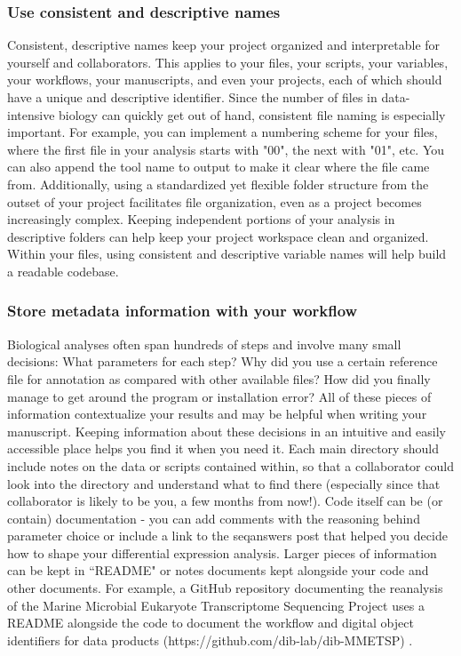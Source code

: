 \documentclass[10pt,letterpaper]{article}
\begin{document}
\subsubsection*{Use consistent and descriptive names}  
Consistent, descriptive names keep your project organized and interpretable for yourself and collaborators. 
This applies to your files, your scripts, your variables, your workflows, your manuscripts, and even your projects, each of which should have a unique and descriptive identifier. 
Since the number of files in data-intensive biology can quickly get out of hand, consistent file naming is especially important. 
For example, you can implement a numbering scheme for your files, where the first file in your analysis starts with "00", the next with "01", etc. 
You can also append the tool name to output to make it clear where the file came from. 
Additionally, using a standardized yet flexible folder structure from the outset of your project facilitates file organization, even as a project becomes increasingly complex. 
Keeping independent portions of your analysis in descriptive folders can help keep your project workspace clean and organized.
Within your files, using consistent and descriptive variable names will help build a readable codebase.

\subsubsection*{Store metadata information with your workflow} 
Biological analyses often span hundreds of steps and involve many small decisions: What parameters for each step? 
Why did you use a certain reference file for annotation as compared with other available files? 
How did you finally manage to get around the program or installation error? 
All of these pieces of information contextualize your results and may be helpful when writing your manuscript. 
Keeping information about these decisions in an intuitive and easily accessible place helps you find it when you need it. 
Each main directory should include notes on the data or scripts contained within, so that a collaborator could look into the directory and understand what to find there (especially since that collaborator is likely to be you, a few months from now!).
Code itself can be (or contain) documentation - you can add comments with the reasoning behind parameter choice or include a link to the seqanswers post that helped you decide how to shape your differential expression analysis. 
Larger pieces of information can be kept in ``README" or notes documents kept alongside your code and other documents. 
For example, a GitHub repository documenting the reanalysis of the Marine Microbial Eukaryote Transcriptome Sequencing Project uses a README alongside the code to document the workflow and digital object identifiers for data products (https://github.com/dib-lab/dib-MMETSP) \cite{johnson2019}.   
\end{document}
